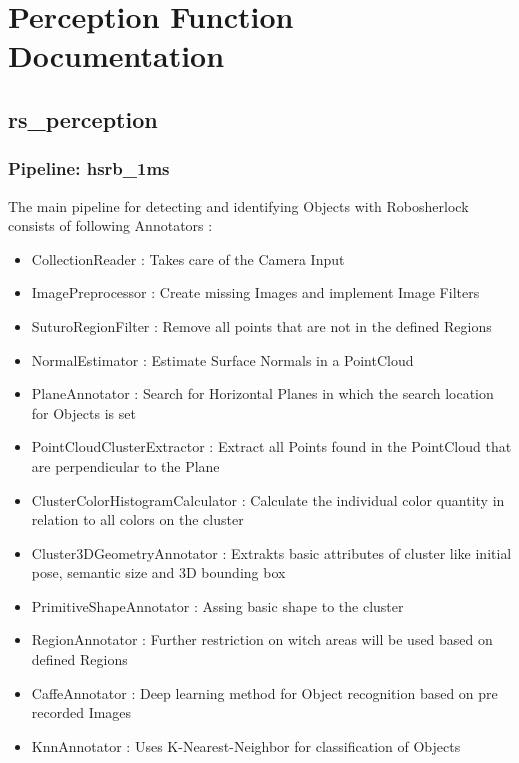 \documentclass[main.tex]{subfiles}
\begin{document}
\begingroup

\renewcommand{\cleardoublepage}{}

\renewcommand{\clearpage}{}

\chapter{Perception Function Documentation}

		\section{rs\_perception}

			\subsection{Pipeline: hsrb\_1ms}

The main pipeline for detecting and identifying Objects with Robosherlock consists of following Annotators :  
\begin{itemize}
	\item CollectionReader : Takes care of the Camera  Input
	\item ImagePreprocessor : Create missing Images and implement Image Filters  
	\item SuturoRegionFilter : Remove all points that are not in the defined Regions 
	\item NormalEstimator : Estimate Surface Normals in a PointCloud 
	\item PlaneAnnotator : Search for Horizontal Planes in which the search location for Objects is set
	\item PointCloudClusterExtractor : Extract all Points found in the PointCloud that are perpendicular to the Plane 
	\item ClusterColorHistogramCalculator : Calculate the individual color quantity in relation to all colors on the cluster   
	\item Cluster3DGeometryAnnotator : Extrakts basic attributes of cluster like initial pose, semantic size and 3D bounding box 
	\item PrimitiveShapeAnnotator : Assing basic shape to the cluster
	\item RegionAnnotator : Further restriction on witch areas will be used based on defined Regions 
	\item CaffeAnnotator : Deep learning method for Object recognition based on pre recorded Images 
	\item KnnAnnotator : Uses K-Nearest-Neighbor for classification of Objects 
\end{itemize}
\end{document}
